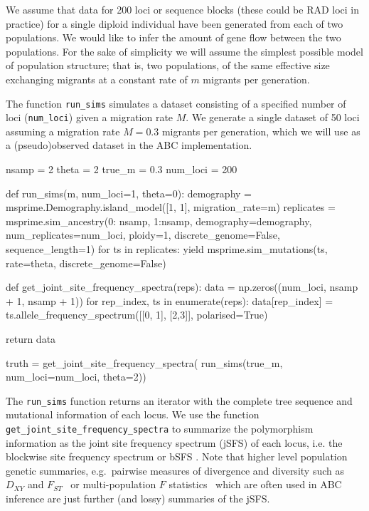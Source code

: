 \documentclass[graybox]{svmult}
\begin{document}
We assume that data for 200 loci or sequence blocks (these could be RAD
loci in practice) for a single diploid individual have been generated
from each of two populations. We would like to infer the amount of gene
flow between the two populations. For the sake of simplicity we will
assume the simplest possible model of population structure; that is, two
populations, of the same effective size exchanging migrants at a
constant rate of $m$ migrants per generation.

The function \texttt{run\_sims} simulates a dataset consisting of a
specified number of loci (\texttt{num\_loci}) given a migration rate
\(M\). We generate a single dataset of 50 loci assuming a migration rate
\(M=0.3\) migrants per generation, which we will use as a (pseudo)observed dataset in the ABC
implementation.

\begin{pythoncode}
nsamp = 2
theta = 2
true_m = 0.3
num_loci = 200

def run_sims(m, num_loci=1, theta=0):
    demography = msprime.Demography.island_model([1, 1], migration_rate=m)
    replicates = msprime.sim_ancestry({0: nsamp, 1:nsamp},
                                      demography=demography,
                                      num_replicates=num_loci, ploidy=1,
                                      discrete_genome=False, sequence_length=1)
    for ts in replicates:
        yield msprime.sim_mutations(ts, rate=theta, discrete_genome=False)

def get_joint_site_frequency_spectra(reps):
    data = np.zeros((num_loci, nsamp + 1, nsamp + 1))
    for rep_index, ts in enumerate(reps):
        data[rep_index] = ts.allele_frequency_spectrum([[0, 1], [2,3]], polarised=True)

    return data

truth = get_joint_site_frequency_spectra(
    run_sims(true_m, num_loci=num_loci, theta=2))
\end{pythoncode}

    The \texttt{run\_sims} function returns an iterator with the complete
tree sequence and mutational information of each locus. We use the
function \texttt{get\_joint\_site\_frequency\_spectra} to summarize the
polymorphism information as the joint site frequency spectrum (jSFS) of
each locus, i.e. the blockwise site frequency spectrum
or bSFS \cite[sensu][]{Lohse2016}.
Note that higher level population genetic summaries, e.g.\ pairwise
measures of divergence and diversity such as \(D_{XY}\) \citep{Nei1972} and
\(F_{ST}\)~\citep{wright1950genetical} or multi-population \(F\)
statistics~\citep{Durand2009,patterson2012ancient} which are often
used in ABC inference are just further (and lossy) summaries of the jSFS.
\end{document}
